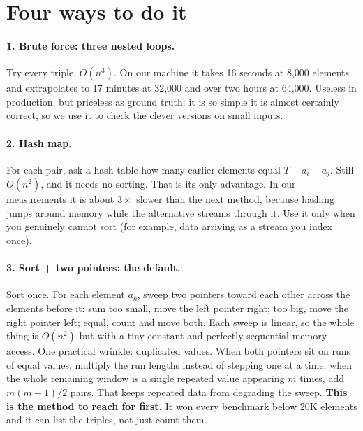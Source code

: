 \documentclass[11pt]{article}
\begin{document}
\section{Four ways to do it}

\paragraph{1. Brute force: three nested loops.}
Try every triple. $O(n^3)$. On our machine it takes 16 seconds at 8{,}000 elements
and extrapolates to 17 minutes at 32{,}000 and over two hours at 64{,}000. Useless in production, but priceless
as ground truth: it is so simple it is almost certainly correct, so we use it to
check the clever versions on small inputs.

\paragraph{2. Hash map.}
For each pair, ask a hash table how many earlier elements equal $T - a_i - a_j$.
Still $O(n^2)$, and it needs no sorting. That is its only advantage. In our
measurements it is about $3\times$ slower than the next method, because hashing
jumps around memory while the alternative streams through it. Use it only when
you genuinely cannot sort (for example, data arriving as a stream you index once).

\paragraph{3. Sort + two pointers: the default.}
Sort once. For each element $a_k$, sweep two pointers toward each other across the
elements before it: sum too small, move the left pointer right; too big, move the
right pointer left; equal, count and move both. Each sweep is linear, so the whole
thing is $O(n^2)$ but with a tiny constant and perfectly sequential memory access.
One practical wrinkle: duplicated values. When both pointers sit on runs of equal
values, multiply the run lengths instead of stepping one at a time; when the whole
remaining window is a single repeated value appearing $m$ times, add
$m(m-1)/2$ pairs. That keeps repeated data from degrading the sweep.
\textbf{This is the method to reach for first.} It won every benchmark below
$20$K elements and it can list the triples, not just count them.
\end{document}

